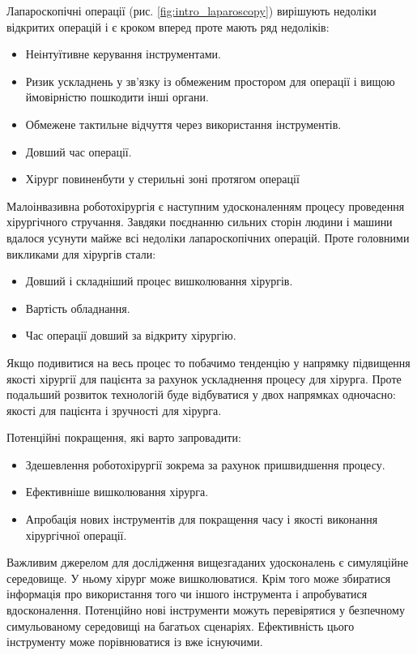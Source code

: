 Лапароскопічні операції (рис. \ref{fig:intro_laparoscopy}) вирішують недоліки відкритих операцій і є кроком вперед проте
мають ряд недоліків:
\begin{itemize}
  \item Неінтуїтивне керування інструментами.
  \item Ризик ускладнень у зв'язку із обмеженим простором для операції і вищою ймовірністю пошкодити інші органи.
  \item Обмежене тактильне відчуття через використання інструментів.
  \item Довший час операції.
  \item Хірург повинен бути у стерильні зоні протягом операції
\end{itemize}

Малоінвазивна роботохірургія є наступним удосконаленням процесу проведення хірургічного стручання. Завдяки поєднанню 
сильних сторін людини і машини вдалося усунути майже всі недоліки лапароскопічних операцій. Проте головними викликами 
для хірургів стали:
\begin{itemize}
  \item Довший і складніший процес вишколювання хірургів.
  \item Вартість обладнання.
  \item Час операції довший за відкриту хірургію.
\end{itemize}

Якщо подивитися на весь процес то побачимо тенденцію у напрямку підвищення якості хірургії для пацієнта за рахунок 
ускладнення процесу для хірурга. Проте подальший розвиток технологій буде відбуватися у двох напрямках одночасно: якості
для пацієнта і зручності для хірурга.

Потенційні покращення, які варто запровадити: 
\begin{itemize}
  \item Здешевлення роботохірургії зокрема за рахунок пришвидшення процесу.
  \item Ефективніше вишколювання хірурга.
  \item Апробація нових інструментів для покращення часу і якості виконання хірургічної операції.
\end{itemize}

Важливим джерелом для дослідження вищезгаданих удосконалень є симуляційне середовище. У ньому хірург може вишколюватися.
Крім того може збиратися інформація про використання того чи іншого інструмента і апробуватися вдосконалення. Потенційно
нові інструменти можуть перевірятися у безпечному симульованому середовищі на багатьох сценаріях. Ефективність цього 
інструменту може порівнюватися із вже існуючими.

